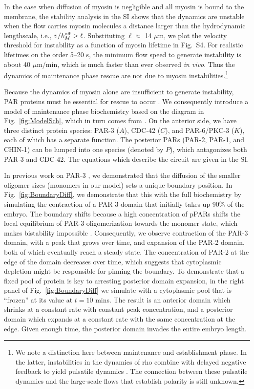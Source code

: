 \documentclass[11pt]{article}
\newcommand{\6}[1]{#1_{\text{6}}}
\newcommand{\3}[1]{#1_{\text{3}}}
\begin{document}
In the case when diffusion of myosin is negligible and all myosin is bound to the membrane, the stability analysis in the SI shows that the dynamics are unstable when the flow carries myosin molecules a distance larger than the hydrodynamic lengthscale, i.e., $v / k^\text{off}_M > \ell$. Substituting $\ell \approx$ 14 $\mu$m, we plot the velocity threshold for instability as a function of myosin lifetime in Fig.\ S4. For realistic lifetimes on the order 5--20 s, the minimum flow speed to generate instability is about 40 $\mu$m/min, which is much faster than ever observed \emph{in vivo}. Thus the dynamics of maintenance phase rescue are not due to myosin instabilities.\footnote{We note a distinction here between maintenance and establishment phase. In the latter, instabilities in the dynamics of rho combine with delayed negative feedback to yield pulsatile dynamics \citep{nishikawa2017controlling, michaux2018excitable, michaud2022versatile}. The connection between these pulsatile dynamics and the large-scale flows that establish polarity is still unknown.}


Because the dynamics of myosin alone are insufficient to generate instability, PAR proteins must be essential for rescue to occur \citep{zonies2010symmetry}. We consequently introduce a model of maintenance phase biochemistry based on the diagram in Fig.\ \ref{fig:ModelSch}, which in turn comes from \citep[Fig.~2]{lang2017proteins}. On the anterior side, we have three distinct protein species: PAR-3 ($A$), CDC-42 ($C$), and PAR-6/PKC-3 ($K$), each of which has a separate function. The posterior PARs (PAR-2, PAR-1, and CHIN-1) can be lumped into one species (denoted by $P$), which antagonizes both PAR-3 and CDC-42. The equations which describe the circuit are given in the SI.


In previous work on PAR-3 \citep{lang2023oligomerization}, we demonstrated that the diffusion of the smaller oligomer sizes (monomers in our model) sets a unique boundary position. In Fig.\ \ref{fig:BoundaryDiff}, we demonstrate that this with the full biochemistry by simulating the contraction of a PAR-3 domain that initially takes up 90\% of the embryo. The boundary shifts because a high concentration of pPARs shifts the local equilibrium of PAR-3 oligomerization towards the monomer state, which makes bistability impossible \citep{lang2023oligomerization}. Consequently, we observe contraction of the PAR-3 domain, with a peak that grows over time, and expansion of the PAR-2 domain, both of which eventually reach a steady state. The concentration of PAR-2 at the edge of the domain decreases over time, which suggests that cytoplasmic depletion might be responsible for pinning the boundary. To demonstrate that a fixed pool of protein is key to arresting posterior domain expansion, in the right panel of Fig.\ \ref{fig:BoundaryDiff} we simulate with a cytoplasmic pool that is ``frozen'' at its value at $t = 10$ mins. The result is an anterior domain which shrinks at a constant rate with constant peak concentration, and a posterior domain which expands at a constant rate with the same concentration at the edge. Given enough time, the posterior domain invades the entire embryo length. 
\end{document}
